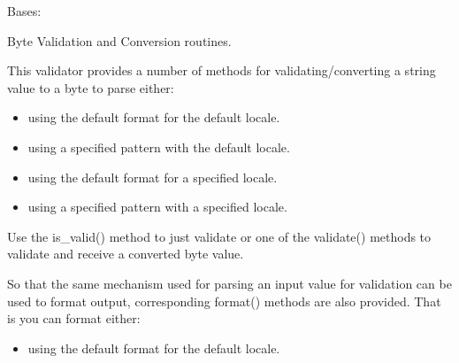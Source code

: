 \documentclass[letterpaper,10pt,english]{sphinxmanual}
\begin{document}
\begin{fulllineitems}
\label{\detokenize{apache_commons_validator_python.routines:apache_commons_validator_python.routines.byte_validator.ByteValidator}}
\pysigstartsignatures
{}
\pysigstopsignatures
\sphinxAtStartPar
Bases: {\hyperref[\detokenize{apache_commons_validator_python.routines:apache_commons_validator_python.routines.abstract_number_validator.AbstractNumberValidator}]{}}

\sphinxAtStartPar
Byte Validation and Conversion routines.

\sphinxAtStartPar
This validator provides a number of methods for validating/converting a string value
to a byte to parse either:
\begin{itemize}
\item {} 
\sphinxAtStartPar
using the default format for the default locale.

\item {} 
\sphinxAtStartPar
using a specified pattern with the default locale.

\item {} 
\sphinxAtStartPar
using the default format for a specified locale.

\item {} 
\sphinxAtStartPar
using a specified pattern with a specified locale.

\end{itemize}

\sphinxAtStartPar
Use the is\_valid() method to just validate or one of the validate() methods to
validate and receive a converted byte value.

\sphinxAtStartPar
So that the same mechanism used for parsing an input value for validation can be used to format output,
corresponding format() methods are also provided. That is you can format either:
\begin{itemize}
\item {} 
\sphinxAtStartPar
using the default format for the default locale.


\end{itemize}
\end{fulllineitems}
\end{document}
